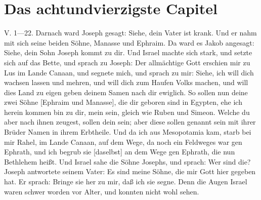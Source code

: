 \section{Das achtundvierzigste Capitel}

V. 1—22. Darnach ward Joseph gesagt: Siehe, dein Vater ist krank. Und er nahm mit sich seine beiden Söhne, Manasse und Ephraim. Da ward es Jakob angesagt: Siehe, dein Sohn Joseph kommt zu dir. Und Israel machte sich stark, und setzte sich auf das Bette, und sprach zu Joseph: Der allmächtige Gott erschien mir zu Lus im Lande Canaan, und segnete mich, und sprach zu mir: Siehe, ich will dich wachsen lassen und mehren, und will dich zum Haufen Volks machen, und will dies Land zu eigen geben deinem Samen nach dir ewiglich. So sollen nun deine zwei Söhne [Ephraim und Manasse], die dir geboren sind in Egypten, ehe ich herein kommen bin zu dir, mein sein, gleich wie Ruben und Simeon. Welche du aber nach ihnen zeugest, sollen dein sein; aber diese sollen genannt sein mit ihrer Brüder Namen in ihrem Erbtheile. Und da ich aus Mesopotamia kam, starb bei mir Rahel, im Lande Canaan, auf dem Wege, da noch ein Feldweges war gen Ephrath, und ich begrub sie [daselbst] an dem Wege gen Ephrath, die nun Bethlehem heißt. Und Israel sahe die Söhne Josephs, und sprach: Wer sind die? Joseph antwortete seinem Vater: Es sind meine Söhne, die mir Gott hier gegeben hat. Er sprach: Bringe sie her zu mir, daß ich sie segne. Denn die Augen Israel waren schwer worden vor Alter, und konnten nicht wohl sehen.
